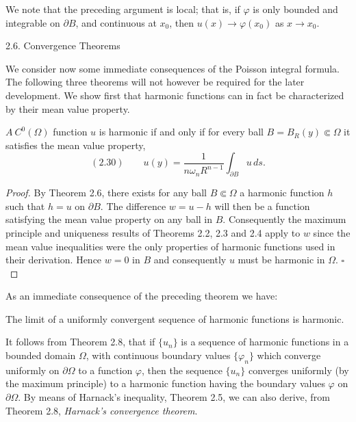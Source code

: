 We note that the preceding argument is local; that is, if $\varphi$ is only bounded and integrable on $\partial B$, and continuous at $x_0$, then $u(x)\to\varphi(x_0)$ as $x\to x_0$.

2.6. Convergence Theorems

We consider now some immediate consequences of the Poisson integral formula. The following three theorems will not however be required for the later development. We show first that harmonic functions can in fact be characterized by their mean value property.

\begin{theorem}\label{gt.thm2.7}
$A\ C^0(\Omega)$ function $u$ is harmonic if and only if for every ball $B=B_R(y)\Subset\Omega$ it satisfies the mean value property,
\[
(2.30)\qquad u(y)=\frac{1}{n\omega_nR^{n-1}}\int_{\partial B} u\,ds.
\]

\begin{proof}
By Theorem 2.6, there exists for any ball $B\Subset\Omega$ a harmonic function $h$ such that $h=u$ on $\partial B$. The difference $w=u-h$ will then be a function satisfying the mean value property on any ball in $B$. Consequently the maximum principle and uniqueness results of Theorems 2.2, 2.3 and 2.4 apply to $w$ since the mean value inequalities were the only properties of harmonic functions used in their derivation. Hence $w=0$ in $B$ and consequently $u$ must be harmonic in $\Omega$. $\square$
\end{proof}
\end{theorem}

As an immediate consequence of the preceding theorem we have:

\begin{theorem}\label{gt.thm2.8}
The limit of a uniformly convergent sequence of harmonic functions is harmonic.
\end{theorem}



It follows from Theorem 2.8, that if $\{u_n\}$ is a sequence of harmonic functions in a bounded domain $\Omega$, with continuous boundary values $\{\varphi_n\}$ which converge uniformly on $\partial\Omega$ to a function $\varphi$, then the sequence $\{u_n\}$ converges uniformly (by the maximum principle) to a harmonic function having the boundary values $\varphi$ on $\partial\Omega$. By means of Harnack's inequality, Theorem 2.5, we can also derive, from Theorem 2.8, \textit{Harnack's convergence theorem}.

